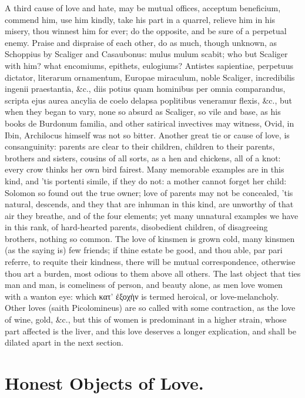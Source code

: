 {A third cause of love and hate, may be mutual offices, acceptum
beneficium, commend him, use him kindly, take his part in a
quarrel, relieve him in his misery, thou winnest him for ever; do the
opposite, and be sure of a perpetual enemy. Praise and dispraise of
each other, do as much, though unknown, as Schoppius by Scaliger
and Casaubonus: mulus mulum scabit; who but Scaliger with him? what
encomiums, epithets, eulogiums? Antistes sapientiae, perpetuus
dictator, literarum ornamentum, Europae miraculum, noble Scaliger,
 incredibilis ingenii praestantia, \&c., diis potius quam
hominibus per omnia comparandus, scripta ejus aurea ancylia de coelo
delapsa poplitibus veneramur flexis, \&c., but when they began to
vary, none so absurd as Scaliger, so vile and base, as his books de
Burdonum familia, and other satirical invectives may witness, Ovid, in
Ibin, Archilocus himself was not so bitter. Another great tie or cause
of love, is consanguinity: parents are clear to their children,
children to their parents, brothers and sisters, cousins of all sorts,
as a hen and chickens, all of a knot: every crow thinks her own bird
fairest. Many memorable examples are in this kind, and 'tis portenti
simile, if they do not: a mother cannot forget her child: Solomon
so found out the true owner; love of parents may not be concealed, 'tis
natural, descends, and they that are inhuman in this kind, are unworthy
of that air they breathe, and of the four elements; yet many unnatural
examples we have in this rank, of hard-hearted parents, disobedient
children, of disagreeing brothers, nothing so common. The love of
kinsmen is grown cold, many kinsmen (as the saying is) few
friends; if thine estate be good, and thou able, par pari referre, to
requite their kindness, there will be mutual correspondence, otherwise
thou art a burden, most odious to them above all others. The last
object that ties man and man, is comeliness of person, and beauty
alone, as men love women with a wanton eye: which κατ' ἐξοχὴν is termed
heroical, or love-melancholy. Other loves (saith Picolomineus) are so
called with some contraction, as the love of wine, gold, \&c., but this
of women is predominant in a higher strain, whose part affected is the
liver, and this love deserves a longer explication, and shall be
dilated apart in the next section.

\section{Honest Objects of Love.}

}
